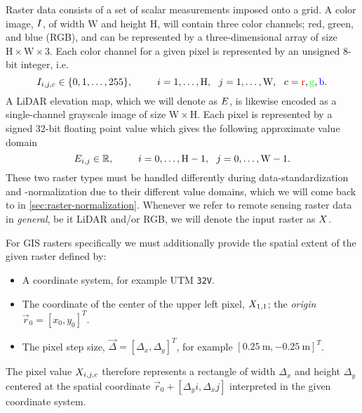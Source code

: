 Raster data consists of a set of scalar measurements imposed onto a grid.
A color image, $I$, of width $\mathrm{W}$ and height $\mathrm{H}$, will contain three color channels; red, green, and blue (RGB), and can be represented by a three-dimensional array of size $\mathrm{H} \times \mathrm{W} \times \mathrm{3}$.
Each color channel for a given pixel is represented by an unsigned 8-bit integer, i.e.
%
\begin{equation*}
  I_{i, j, c} \in \{0, 1, \ldots, 255\},
  \hspace{2.5em}
  i = 1, \ldots, \mathrm{H} ,
  ~~
  j = 1, \ldots, \mathrm{W},
  ~~
  c = \mathrm{\textcolor{red}{r}, \textcolor{green}{g}, \textcolor{blue}{b}}.
\end{equation*}
%
A LiDAR elevation map, which we will denote as $E$, is likewise encoded as a single-channel grayscale image of size $\mathrm{W} \times \mathrm{H}$.
Each pixel is represented by a signed 32-bit floating point value which gives the following approximate value domain
%
\begin{equation*}
  E_{i, j} \in \mathbb{R},
  \hspace{2.5em}
  i = 0, \ldots, \mathrm{H} - 1,
  ~~
  j = 0, \ldots, \mathrm{W} - 1.
\end{equation*}
%
These two raster types must be handled differently during data-standardization and -normalization due to their different value domains, which we will come back to in \cref{sec:raster-normalization}.
Whenever we refer to remote sensing raster data in \emph{general}, be it LiDAR and/or RGB, we will denote the input raster as $X$.

For GIS rasters specifically we must additionally provide the spatial extent of the given raster defined by:
\begin{itemize}[noitemsep]
  \item A coordinate system, for example UTM \texttt{32V}.
  \item The coordinate of the center of the upper left pixel, $X_{1, 1}$; the \textit{origin} $\vec{r}_0 = {[x_0, y_0]}^T$.
  \item The pixel step size, $\vec{\Delta} = {[\Delta_x, \Delta_y]}^T$, for example ${[\SI{0.25}{\meter}, \SI{-0.25}{\meter}]}^T$.
\end{itemize}

The pixel value $X_{i, j, c}$ therefore represents a rectangle of width $\Delta_x$ and height $\Delta_y$ centered at the spatial coordinate $\vec{r}_0 + [\Delta_y i, \Delta_x j]$ interpreted in the given coordinate system.

